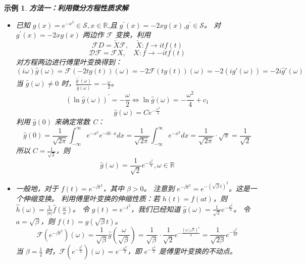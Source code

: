 \documentclass[linespread=1.5,openany]{book}%
\theoremstyle{plain}
\newtheorem{example}[theorem]{示例}
\begin{document}
{{\begin{example}
					
					\textbf{方法一：利用微分方程性质求解}
					\begin{itemize}
						\item[(1)]已知 \( g(x)=e^{-x^{2}} \in \mathcal{S} , x\in\mathbb{R}\),且 \( g^{\prime}(x)=-2xg(x) \),\( g^{\prime} \in \mathcal{S} \)。
						对 \( g^{\prime}(x)=-2xg(x) \) 两边作 \( \mathcal{F} \) 变换，利用 
						\[ \mathcal{F}D = \tilde{X}\mathcal{F}, \quad \tilde{X}:f\to itf(t) \]
						\[ \mathcal{DF} = \mathcal{F}X, \quad X:f\to -itf(t)\]
						对方程两边进行傅里叶变换得到：
						\[(i\omega)\hat{g}(\omega)=\mathcal{F}(-2tg(t))(\omega) = -2\mathcal{F}(tg(t))(\omega) = -2(i\hat{g}'(\omega)) = -2i\hat{g}'(\omega)\]
						当 \( \hat{g}(\omega)\neq0 \) 时，\( \frac{\hat{g}^{\prime}(\omega)}{\hat{g}(\omega)}=-\frac{\omega}{2} \)。
						\[(\ln\hat{g}(\omega))^{\prime}=-\frac{\omega}{2} \Leftrightarrow \ln\hat{g}(\omega)=-\frac{\omega^{2}}{4}+c_{1}\]
						\[\hat{g}(\omega)=C e^{-\frac{\omega^{2}}{4}}\]
						利用 \( \hat{g}(0)\) 来确定常数 C：
						\[ \hat{g}(0)=\frac{1}{\sqrt{2\pi}}\int_{-\infty}^{\infty}e^{-x^{2}}e^{-i0\cdot x}dx=\frac{1}{\sqrt{2\pi}}\int_{-\infty}^{\infty}e^{-x^{2}}dx=\frac{1}{\sqrt{2\pi}}\cdot\sqrt{\pi}=\frac{1}{\sqrt{2}} \]
						所以 \( C=\frac{1}{\sqrt{2}} \)，则 \[ \hat{g}(\omega)=\frac{1}{\sqrt{2}}e^{-\frac{\omega^{2}}{4}}, \omega\in\mathbb{R} \]
						
						\item[(2)]一般地，对于 \(f(t) = e^{-\beta t^2}\)，其中 \(\beta > 0\)。
						注意到 \( e^{-\beta t^{2}}=e^{-(\sqrt{\beta}t)^2} \)。这是一个伸缩变换。
						利用傅里叶变换的伸缩性质：若 \(h(t) = f(at)\)，则 \(\hat{h}(\omega) = \frac{1}{|a|}\hat{f}(\frac{\omega}{a})\)。
						令 \(g(t) = e^{-t^2}\)，我们已经知道 \(\hat{g}(\omega) = \frac{1}{\sqrt{2}}e^{-\frac{\omega^2}{4}}\)。
						令 \(a = \sqrt{\beta}\)，则 \(f(t) = g(\sqrt{\beta}t)\)。
						\[	\mathcal{F}(e^{-\beta t^{2}})(\omega) = \frac{1}{\sqrt{\beta}} \hat{g}\left(\frac{\omega}{\sqrt{\beta}}\right) = \frac{1}{\sqrt{\beta}} \cdot \frac{1}{\sqrt{2}} e^{-\frac{(\omega/\sqrt{\beta})^2}{4}} = \frac{1}{\sqrt{2\beta}}e^{-\frac{\omega^{2}}{4\beta}}\]
						当 \( \beta = \frac{1}{2} \) 时，\( \mathcal{F}\left(e^{-\frac{t^{2}}{2}}\right)(\omega)=e^{-\frac{\omega^{2}}{2}} \)，即 \( e^{-\frac{x^{2}}{2}} \) 是傅里叶变换的不动点。
					\end{itemize}
					
					\vspace{\baselineskip}
					

\end{example}}}
\end{document}

